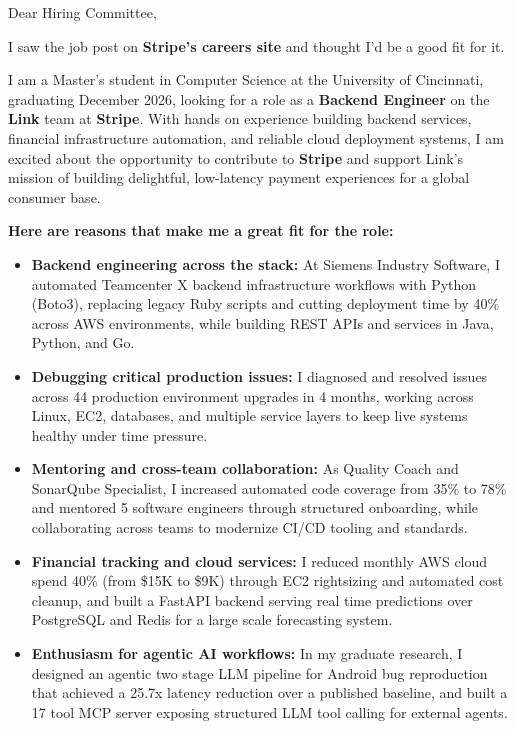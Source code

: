 \documentclass[11pt]{letter}
\date{}
\begin{document}
\begin{letter}{}

\opening{Dear Hiring Committee,}

I saw the job post on \textbf{Stripe's careers site} and thought I'd be a good fit for it.

I am a Master's student in Computer Science at the University of Cincinnati, graduating December 2026, looking for a role as a \textbf{Backend Engineer} on the \textbf{Link} team at \textbf{Stripe}. With hands on experience building backend services, financial infrastructure automation, and reliable cloud deployment systems, I am excited about the opportunity to contribute to \textbf{Stripe} and support Link's mission of building delightful, low-latency payment experiences for a global consumer base.

\textbf{Here are reasons that make me a great fit for the role:}

\begin{itemize}[leftmargin=*, itemsep=0.45em]
    \item \textbf{Backend engineering across the stack:} At Siemens Industry Software, I automated Teamcenter X backend infrastructure workflows with Python (Boto3), replacing legacy Ruby scripts and cutting deployment time by 40\% across AWS environments, while building REST APIs and services in Java, Python, and Go.

    \item \textbf{Debugging critical production issues:} I diagnosed and resolved issues across 44 production environment upgrades in 4 months, working across Linux, EC2, databases, and multiple service layers to keep live systems healthy under time pressure.

    \item \textbf{Mentoring and cross-team collaboration:} As Quality Coach and SonarQube Specialist, I increased automated code coverage from 35\% to 78\% and mentored 5 software engineers through structured onboarding, while collaborating across teams to modernize CI/CD tooling and standards.

    \item \textbf{Financial tracking and cloud services:} I reduced monthly AWS cloud spend 40\% (from \$15K to \$9K) through EC2 rightsizing and automated cost cleanup, and built a FastAPI backend serving real time predictions over PostgreSQL and Redis for a large scale forecasting system.

    \item \textbf{Enthusiasm for agentic AI workflows:} In my graduate research, I designed an agentic two stage LLM pipeline for Android bug reproduction that achieved a 25.7x latency reduction over a published baseline, and built a 17 tool MCP server exposing structured LLM tool calling for external agents.
\end{itemize}


\end{letter}
\end{document}
